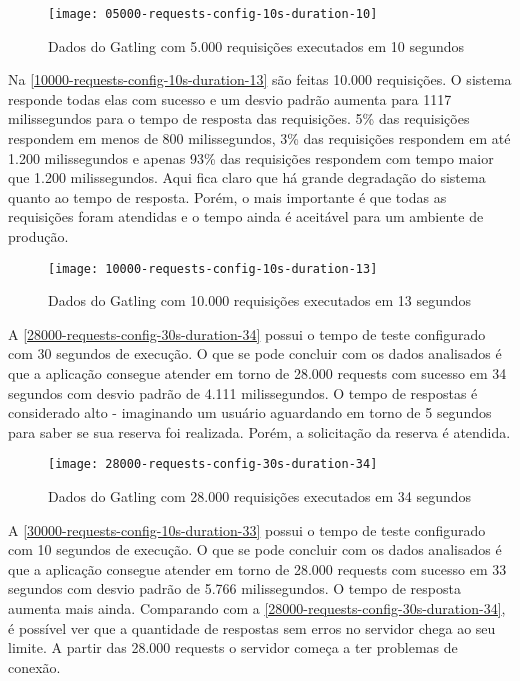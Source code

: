 \begin{figure}[h]
  \texttt{[image: 05000-requests-config-10s-duration-10]}
  \caption{Dados do Gatling com 5.000 requisições executados em 10 segundos}
  \label{05000-requests-config-10s-duration-10}
\end{figure}

Na \autoref{10000-requests-config-10s-duration-13} são feitas 10.000 requisições.
O sistema responde todas elas com sucesso e um desvio padrão aumenta para 1117 milissegundos
para o tempo de resposta das requisições.
5\% das requisições respondem em menos de 800 milissegundos, 3\% das requisições
respondem em até 1.200 milissegundos e apenas 93\% das requisições
respondem com tempo maior que 1.200 milissegundos. Aqui fica claro que há grande
degradação do sistema quanto ao tempo de resposta. Porém, o mais importante
é que todas as requisições foram atendidas e o tempo ainda é aceitável para
um ambiente de produção.

\begin{figure}[h]
  \texttt{[image: 10000-requests-config-10s-duration-13]}
  \caption{Dados do Gatling com 10.000 requisições executados em 13 segundos}
  \label{10000-requests-config-10s-duration-13}
\end{figure}

A \autoref{28000-requests-config-30s-duration-34} possui o tempo de teste configurado
com 30 segundos de execução.
O que se pode concluir com os dados analisados é que a aplicação consegue atender
em torno de 28.000 requests com sucesso em 34 segundos com desvio padrão de
4.111 milissegundos.
O tempo de respostas é considerado alto - imaginando um usuário aguardando em
torno de 5 segundos para saber se sua reserva foi realizada.
Porém, a solicitação da reserva é atendida.

\begin{figure}[h]
  \texttt{[image: 28000-requests-config-30s-duration-34]}
  \caption{Dados do Gatling com 28.000 requisições executados em 34 segundos}
  \label{28000-requests-config-30s-duration-34}
\end{figure}

A \autoref{30000-requests-config-10s-duration-33} possui o tempo de teste configurado
com 10 segundos de execução.
O que se pode concluir com os dados analisados é que a aplicação consegue atender
em torno de 28.000 requests com sucesso em 33 segundos com desvio padrão de
5.766 milissegundos.
O tempo de resposta aumenta mais ainda.
Comparando com a \autoref{28000-requests-config-30s-duration-34}, é possível ver
que a quantidade de respostas sem erros no servidor chega ao seu limite.
A partir das 28.000 requests o servidor começa a ter problemas de conexão.

